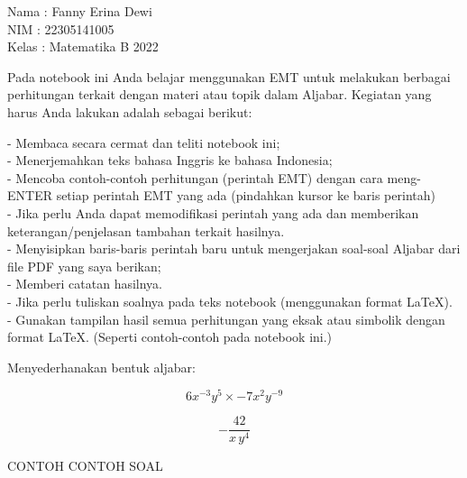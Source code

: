 \documentclass[a4paper,10pt]{article}
\begin{document}
\begin{eulernotebook}
\begin{eulercomment}
Nama  : Fanny Erina Dewi\\
NIM   : 22305141005\\
Kelas : Matematika B 2022\\
\end{eulercomment}
\eulersubheading{}
\begin{eulercomment}
Pada notebook ini Anda belajar menggunakan EMT untuk melakukan
berbagai perhitungan terkait dengan materi atau topik dalam Aljabar.
Kegiatan yang harus Anda lakukan adalah sebagai berikut:

- Membaca secara cermat dan teliti notebook ini;\\
- Menerjemahkan teks bahasa Inggris ke bahasa Indonesia;\\
- Mencoba contoh-contoh perhitungan (perintah EMT) dengan cara
meng-ENTER setiap perintah EMT yang ada (pindahkan kursor ke baris
perintah)\\
- Jika perlu Anda dapat memodifikasi perintah yang ada dan memberikan
keterangan/penjelasan tambahan terkait hasilnya.\\
- Menyisipkan baris-baris perintah baru untuk mengerjakan soal-soal
Aljabar dari file PDF yang saya berikan;\\
- Memberi catatan hasilnya.\\
- Jika perlu tuliskan soalnya pada teks notebook (menggunakan format
LaTeX).\\
- Gunakan tampilan hasil semua perhitungan yang eksak atau simbolik
dengan format LaTeX. (Seperti contoh-contoh pada notebook ini.)

\end{eulercomment}
\begin{eulercomment}
Menyederhanakan bentuk aljabar:

\end{eulercomment}
\begin{eulerformula}
\[
6x^{-3}y^5\times -7x^2y^{-9}
\]
\end{eulerformula}
\begin{eulercomment}
\end{eulercomment}
\begin{eulerformula}
\[
-\frac{42}{x\,y^4}
\]
\end{eulerformula}
\begin{eulercomment}
CONTOH CONTOH SOAL


\end{eulercomment}
\end{eulernotebook}
\end{document}
